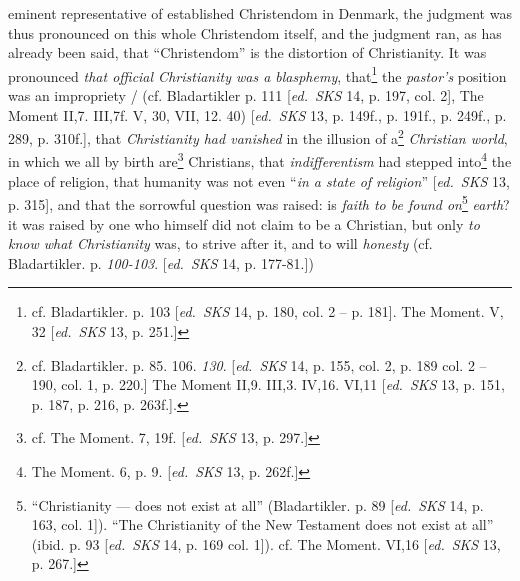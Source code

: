 \documentclass[12pt,a4paper,openany]{book}
\newcommand{\ed}[1]{{\small[\textit{ed.}\ #1]}}
\begin{document}
eminent representative of established Christendom in Denmark,
the judgment was thus pronounced on this whole Christendom itself,
and the judgment ran, as has already been said, that ``Christendom'' is
the distortion of Christianity. It was pronounced \emph{that official Christianity
was a blasphemy}, that\footnote[104]{cf. Bladartikler. p. 103 \ed{\emph{SKS} 14, p. 180, col. 2 -- p. 181}. The Moment. V, 32 \ed{\emph{SKS}
13, p. 251.}}
the \emph{pastor's} position was an impropriety /
(cf. Bladartikler p. 111 \ed{\emph{SKS} 14, p. 197, col. 2}, The Moment II,7.
III,7f. V, 30, VII, 12. 40) \ed{\emph{SKS} 13, p. 149f., p. 191f., p. 249f., p. 289, p.
310f.}, that \emph{Christianity had vanished} in the illusion of a\footnote[105]{cf. Bladartikler. p. 85. 106. \emph{130}. \ed{\emph{SKS} 14, p. 155, col. 2, p. 189 col. 2 -- 190, col. 1, p.
220.} The Moment II,9. III,3. IV,16. VI,11 \ed{\emph{SKS} 13, p. 151, p. 187, p. 216, p. 263f.}.}
\emph{Christian world}, in which we all by birth are\footnote[106]{cf. The Moment. 7, 19f. \ed{\emph{SKS} 13, p. 297.}}
Christians, that \emph{indifferentism}
had stepped into\footnote[107]{The Moment. 6, p. 9. \ed{\emph{SKS} 13, p. 262f.}}
the place of religion, that humanity was not even
``\emph{in a state of religion}'' \ed{\emph{SKS} 13, p. 315}, and that the sorrowful question
was raised: is \emph{faith to be found on}\footnote[108]{``Christianity --- does not exist at all'' (Bladartikler. p. 89 \ed{\emph{SKS} 14, p. 163, col. 1}).
``The Christianity of the New Testament does not exist at all'' (ibid. p. 93 \ed{\emph{SKS} 14, p. 169 col. 1}).
cf. The Moment. VI,16 \ed{\emph{SKS} 13, p. 267.}}
\emph{earth}? it was raised by
one who himself did not claim to be a Christian, but only \emph{to know
what Christianity} was, to strive after it, and to will \emph{honesty} (cf.
Bladartikler. p. \emph{100-103}. \ed{\emph{SKS} 14, p. 177-81.})
\end{document}
